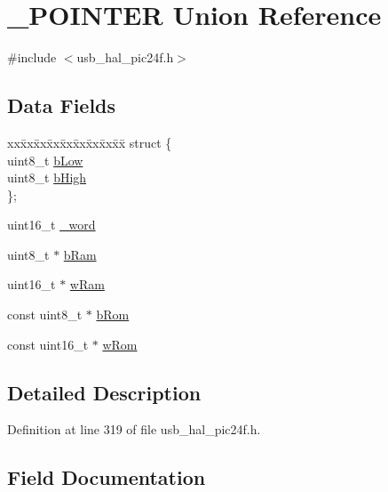 \hypertarget{union___p_o_i_n_t_e_r}{}\section{\+\_\+\+P\+O\+I\+N\+T\+ER Union Reference}
\label{union___p_o_i_n_t_e_r}


{\ttfamily \#include $<$usb\+\_\+hal\+\_\+pic24f.\+h$>$}

\subsection*{Data Fields}
\begin{DoxyCompactItemize}
\item 
\begin{tabbing}
xx\=xx\=xx\=xx\=xx\=xx\=xx\=xx\=xx\=\kill
struct \{\\
\>uint8\_t \mbox{\hyperlink{union___p_o_i_n_t_e_r_a4fd529a929a6e33cb6216934961a8cf0}{bLow}}\\
\>uint8\_t \mbox{\hyperlink{union___p_o_i_n_t_e_r_a9415d74951bbdb3ae28bc33b5db7d1e2}{bHigh}}\\
\}; \\

\end{tabbing}\item 
uint16\+\_\+t \mbox{\hyperlink{union___p_o_i_n_t_e_r_a957c357acebf129016c23a180c55a138}{\+\_\+word}}
\item 
uint8\+\_\+t $\ast$ \mbox{\hyperlink{union___p_o_i_n_t_e_r_ade44ba3aaf3f950f4c95a2eae3c52266}{b\+Ram}}
\item 
uint16\+\_\+t $\ast$ \mbox{\hyperlink{union___p_o_i_n_t_e_r_a7fbff1cee75fe5bc810c6872b4f7f2e7}{w\+Ram}}
\item 
const uint8\+\_\+t $\ast$ \mbox{\hyperlink{union___p_o_i_n_t_e_r_ad199f0db405ddec97c0679ba019934e7}{b\+Rom}}
\item 
const uint16\+\_\+t $\ast$ \mbox{\hyperlink{union___p_o_i_n_t_e_r_a6fd9e98c13e3aa04654f2c5ffd7e758f}{w\+Rom}}
\end{DoxyCompactItemize}


\subsection{Detailed Description}


Definition at line 319 of file usb\+\_\+hal\+\_\+pic24f.\+h.



\subsection{Field Documentation}
\mbox{\label{union___p_o_i_n_t_e_r_a7a3b524045d10628d735cee5da548918}} 

